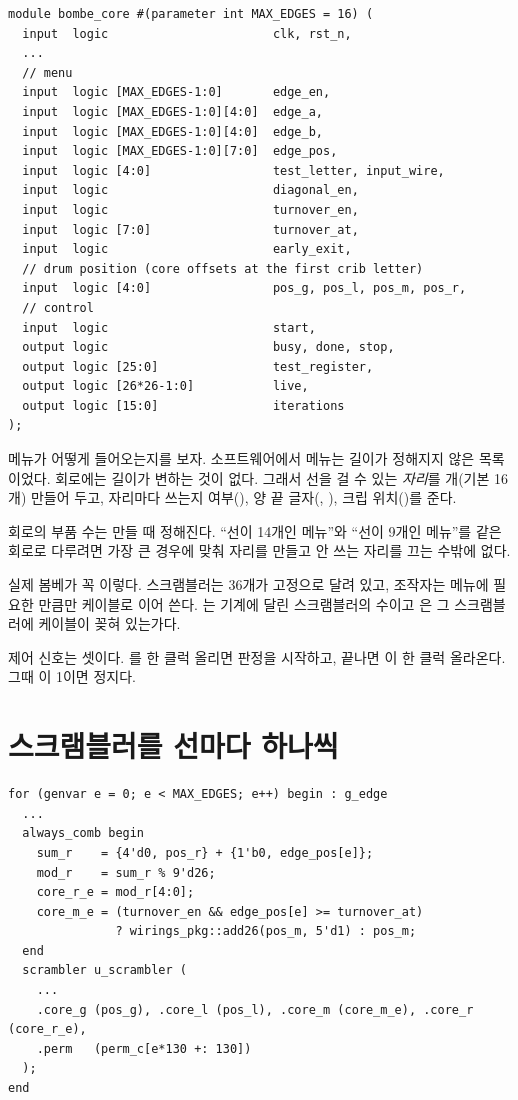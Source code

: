 \begin{lstlisting}[language=SV,caption={\code{bombe\_core.sv}의 입출력(로터 순서 입력은 \code{scrambler}와 같아 생략).}]
module bombe_core #(parameter int MAX_EDGES = 16) (
  input  logic                       clk, rst_n,
  ...
  // menu
  input  logic [MAX_EDGES-1:0]       edge_en,
  input  logic [MAX_EDGES-1:0][4:0]  edge_a,
  input  logic [MAX_EDGES-1:0][4:0]  edge_b,
  input  logic [MAX_EDGES-1:0][7:0]  edge_pos,
  input  logic [4:0]                 test_letter, input_wire,
  input  logic                       diagonal_en,
  input  logic                       turnover_en,
  input  logic [7:0]                 turnover_at,
  input  logic                       early_exit,
  // drum position (core offsets at the first crib letter)
  input  logic [4:0]                 pos_g, pos_l, pos_m, pos_r,
  // control
  input  logic                       start,
  output logic                       busy, done, stop,
  output logic [25:0]                test_register,
  output logic [26*26-1:0]           live,
  output logic [15:0]                iterations
);
\end{lstlisting}

메뉴가 어떻게 들어오는지를 보자. 소프트웨어에서 메뉴는 길이가 정해지지 않은 목록이었다. 회로에는 길이가
변하는 것이 없다. 그래서 선을 걸 수 있는 \emph{자리}를 개(기본 16개) 만들어 두고, 자리마다
쓰는지 여부(), 양 끝 글자(, ), 크립 위치()를 준다.

\Why 회로의 부품 수는 만들 때 정해진다. ``선이 14개인 메뉴''와 ``선이 9개인 메뉴''를 같은 회로로 다루려면
가장 큰 경우에 맞춰 자리를 만들고 안 쓰는 자리를 끄는 수밖에 없다.

\Ours 실제 봄베가 꼭 이렇다. 스크램블러는 36개가 고정으로 달려 있고, 조작자는 메뉴에 필요한 만큼만
케이블로 이어 쓴다. 는 기계에 달린 스크램블러의 수이고 은 그 스크램블러에
케이블이 꽂혀 있는가다.

제어 신호는 셋이다. 를 한 클럭 올리면 판정을 시작하고, 끝나면 이 한 클럭 올라온다.
그때 이 1이면 정지다.

\section{스크램블러를 선마다 하나씩}

\begin{lstlisting}[language=SV,caption={\code{bombe\_core.sv}: 선마다 스크램블러 하나(일부).}]
for (genvar e = 0; e < MAX_EDGES; e++) begin : g_edge
  ...
  always_comb begin
    sum_r    = {4'd0, pos_r} + {1'b0, edge_pos[e]};
    mod_r    = sum_r % 9'd26;
    core_r_e = mod_r[4:0];
    core_m_e = (turnover_en && edge_pos[e] >= turnover_at)
               ? wirings_pkg::add26(pos_m, 5'd1) : pos_m;
  end
  scrambler u_scrambler (
    ...
    .core_g (pos_g), .core_l (pos_l), .core_m (core_m_e), .core_r (core_r_e),
    .perm   (perm_c[e*130 +: 130])
  );
end
\end{lstlisting}

